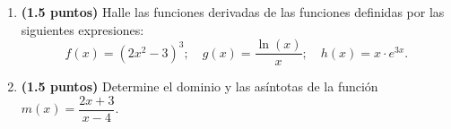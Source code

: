 
\begin{enumerate}[label=\alph*)]
\item \textbf{(1.5 puntos)} Halle las funciones derivadas de las funciones definidas por las siguientes expresiones:
\[
f(x)=(2x^2-3)^3;\quad g(x)=\frac{\ln(x)}{x};\quad h(x)=x\cdot e^{3x}.
\]
\item \textbf{(1.5 puntos)} Determine el dominio y las asíntotas de la función $m(x)=\dfrac{2x+3}{x-4}$.
\end{enumerate}
